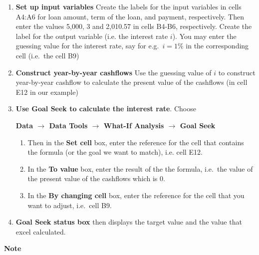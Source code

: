 \documentclass[
]{article}
\theoremstyle{definition}
\theoremstyle{definition}
\theoremstyle{definition}
\theoremstyle{definition}
\theoremstyle{remark}
\begin{document}
\begin{enumerate}
\def\labelenumi{\arabic{enumi}.}
\item
  \textbf{Set up input variables} Create the labels for the input variables
  in cells A4:A6 for loan amount, term of the loan, and payment,
  respectively. Then enter the values 5,000, 3 and 2,010.57 in cells
  B4-B6, respectively. Create the label for the output variable (i.e.
  the interest rate \(i\)). You may enter the guessing value for the
  interest rate, say for e.g.~\(i = 1\%\) in the corresponding cell
  (i.e.~the cell B9)
\item
  \textbf{Construct year-by-year cashflows} Use the guessing value of \(i\)
  to construct year-by-year cashflow to calculate the present value of
  the cashflows (in cell E12 in our example)
\item
  \textbf{Use Goal Seek to calculate the interest rate}. Choose

  \textbf{Data \(\rightarrow\) Data Tools \(\rightarrow\) What-If Analysis \(\rightarrow\) Goal Seek}

  \begin{enumerate}
  \def\labelenumii{\arabic{enumii}.}
  \item
    Then in the \textbf{Set cell} box, enter the reference for the cell
    that contains the formula (or the goal we want to match), i.e.
    cell E12.
  \item
    In the \textbf{To value} box, enter the result of the the formula,
    i.e.~the value of the present value of the cashflows which is 0.
  \item
    In the \textbf{By changing cell} box, enter the reference for the
    cell that you want to adjust, i.e.~cell B9.
  \end{enumerate}
\item
  \textbf{Goal Seek status box} then displays the target value and the
  value that excel calculated.
\end{enumerate}

\textbf{Note}
\end{document}
